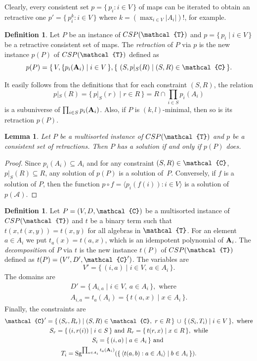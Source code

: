 \documentclass[11pt]{amsart}
\newcommand{\m}[1]{{\uppercase {\mathbf {#1}}}}
\newcommand{\sm}[1]{{\mbox{\scriptsize {\uppercase {\bf {#1}}}}}}
\newcommand{\vr}[1]{{\uppercase {\mathcal{#1}}}}
\newcommand{\Sg}{{\rm Sg}}
\newcommand{\lb}{\langle}
\newcommand{\rb}{\rangle}
\newtheorem{lm}[thm]{Lemma}
\theoremstyle{definition}
\newtheorem{df}[thm]{Definition}
\begin{document}
Clearly, every consistent set $p = \{\, p_i : i\in V \,\}$ of maps can be iterated to obtain an retractive one $p' = \{\, p^k_i : i\in V \,\}$ where $k = (\max_{i\in V} |A_i|)!$, for example. 

\begin{df}\label{retrinst}
Let $P$ be an instance of $CSP(\vr t)$ and $p = \{\, p_i \mid i\in V \,\}$ be a retractive consistent set of maps. The {\em retraction} of $P$ via $p$ is the new instance $p(P)$ of $CSP(\vr t)$ defined as
\[ p(P) = \{\,V, \{p_i(\m a_i) \mid i\in V\,\},\{\ (S,p|_S (R)\mid (S,R)\in \vr c \,\}. \]
\end{df}

It easily follows from the definitions that for each constraint $(S,R)$, the relation
\[ p|_S(R) = \{\, p|_S(r) \mid r\in R \,\} = R\cap\prod_{i\in S}p_i(A_i) \] 
is a subuniverse of $\prod_{i\in S} p_i(\m a_i)$. Also, if $P$ is $(k,l)$-minimal, then so is its retraction $p(P)$.

\begin{lm}\label{l:retraction}
Let $P$ be a multisorted instance of $CSP(\vr t)$ and $p$ be a consistent set of retractions. Then $P$ has a solution if and only if $p(P)$ does.
\end{lm}

\begin{proof}
Since $p_i(A_i)\subseteq A_i$ and for any constraint $(S,R)\in \vr c$, $p|_S(R)\subseteq R$, any solution of $p(P)$ is a solution of~$P$. Conversely, if $f$ is a solution of $P$, then the function $p\circ f = \lb p_i(f(i)) : i\in V\rb$ is a solution of~$p(\mathcal A)$.
\end{proof}

\begin{df}\label{decompdef}
Let $P=(V,D,\vr c)$ be a multisorted instance of $CSP(\vr t)$ and $t$ be a binary term
such that $t(x,t(x,y)) = t(x,y)$ for all algebras in $\vr t$. For an element $a\in A_i$ we put $t_a(x) = t(a,x)$, which is an idempotent polynomial of $\m a_i$.
The {\em decomposition} of $P$ via $t$ is the new instance $t(P)$ of
$CSP(\vr t)$ defined as $t(P) = (V',D',\vr c')$. The variables are
\[ 
V' = \{\,(i,a) \mid i\in V,\ a\in A_i\,\}.
\]
The domains are
\[ \begin{gathered}
D'=\{\,A_{i,a} \mid i\in V,\ a\in A_i\,\},\text{ where}\\
A_{i,a}=t_a(A_i)=\{\, t(a,x) \mid x\in A_i \,\}.
\end{gathered}
\]
Finally, the constraints are
\[ \begin{gathered}
\vr c'=\{\,(S_r,R_r)\mid(S,R)\in \vr c,\ r\in R\,\}\,\cup\,\{\,(S_i,T_i)\mid i\in V\,\},\text{ where}\\
S_r=\{\,(i,r(i)) \mid i\in S\,\}\text{ and }R_r=\{\,t(r,x)\mid x\in R\,\},\text{ while}\\
S_i=\{\,(i,a)\mid a\in A_i\,\}\text{ and }\\
T_i=\Sg^{\prod_{a\in A_i}t_a(\sm a_i)}(\{\,\lb t(a,b):a\in A_i\rb\mid b\in A_i\,\}).
\end{gathered}
\]
\end{df}
\end{document}
